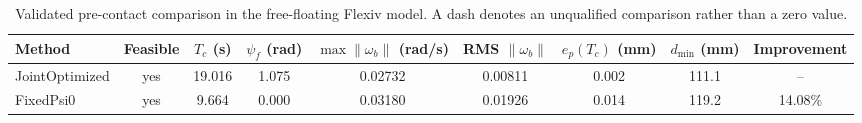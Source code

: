 \begin{table}[t]
\centering
\caption{Validated pre-contact comparison in the free-floating Flexiv model. A dash denotes an unqualified comparison rather than a zero value.}
\label{tab:precontact_comparison}
\begin{tabular}{lcccccccc}
\toprule
Method & Feasible & $T_c$ (s) & $\psi_f$ (rad) & $\max\|\omega_b\|$ (rad/s) & RMS $\|\omega_b\|$ & $e_p(T_c)$ (mm) & $d_{\min}$ (mm) & Improvement \\
\midrule
JointOptimized & yes & 19.016 & 1.075 & 0.02732 & 0.00811 & 0.002 & 111.1 & -- \\
FixedPsi0 & yes & 9.664 & 0.000 & 0.03180 & 0.01926 & 0.014 & 119.2 & 14.08\% \\
\bottomrule
\end{tabular}
\end{table}
